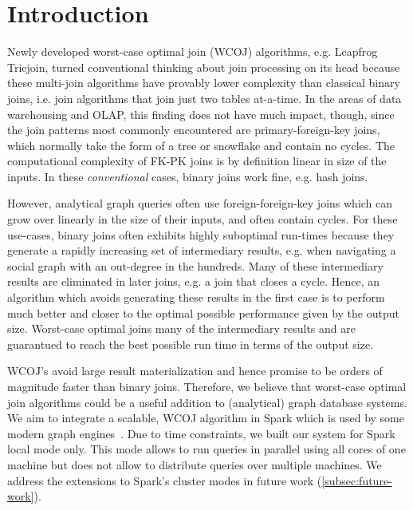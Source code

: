 \section{Introduction} \label{sec:introduction}
Newly developed worst-case optimal join (WCOJ) algorithms, e.g. Leapfrog Triejoin, turned conventional thinking about join processing
on its head because these multi-join algorithms have provably lower complexity than classical binary joins,
i.e. join algorithms that join just two tables at-a-time.
In the areas of data warehousing and OLAP, this finding does not have much impact, though,
since the join patterns most commonly encountered are primary-foreign-key joins,
which normally take the form of a tree or snowflake and contain no cycles.
The computational complexity of FK-PK joins is by definition linear in size of the inputs.
In these \textit{conventional} cases, binary joins work fine, e.g. hash joins.

However, analytical graph queries often use foreign-foreign-key joins which can grow over linearly in the size of their inputs,
and often contain cycles.
For these use-cases, binary joins often exhibits highly suboptimal run-times because they generate a rapidly increasing set of
intermediary results, e.g. when navigating a social graph with an out-degree in the hundreds.
Many of these intermediary results are eliminated in later joins, e.g. a join that closes a cycle.
Hence, an algorithm which avoids generating these results in the first case is to perform much better and
closer to the optimal possible performance given by the output size.
Worst-case optimal joins many of the intermediary results and are guarantued to reach the best possible run time in terms of
the output size.

\textsc{WCOJ}'s avoid large result materialization and hence promise to be orders of magnitude faster than binary
joins.
Therefore, we believe that worst-case optimal join algorithms could be a useful addition to (analytical) graph database systems.
We aim to integrate a scalable, \textsc{WCOJ} algorithm in Spark which is used by some modern graph engines~\cite{caps,g-core,graphFrame}.
Due to time constraints, we built our system for Spark local mode only.
This mode allows to run queries in parallel using all cores of one machine but does not allow to distribute queries over multiple machines.
We address the extensions to Spark's cluster modes in future work (\cref{subsec:future-work}).

